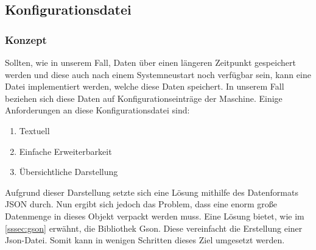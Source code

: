 \subsection{Konfigurationsdatei}\label{subsec:konfiguration}
\subsubsection{Konzept}
Sollten, wie in unserem Fall, Daten über einen längeren Zeitpunkt gespeichert werden und diese auch nach einem Systemneustart noch verfügbar sein, kann eine Datei implementiert werden, welche diese Daten speichert.
In unserem Fall beziehen sich diese Daten auf Konfigurationseinträge der Maschine.
Einige Anforderungen an diese Konfigurationsdatei sind:
\begin{enumerate}
\item Textuell
\item Einfache Erweiterbarkeit
\item Übersichtliche Darstellung
\end{enumerate}
Aufgrund dieser Darstellung setzte sich eine Lösung mithilfe des Datenformats JSON durch.
Nun ergibt sich jedoch das Problem, dass eine enorm große Datenmenge in dieses Objekt verpackt werden muss.
Eine Lösung bietet, wie im \autoref{sssec:gson} erwähnt, die Bibliothek Gson.
Diese vereinfacht die Erstellung einer Json-Datei.
Somit kann in wenigen Schritten dieses Ziel umgesetzt werden.
